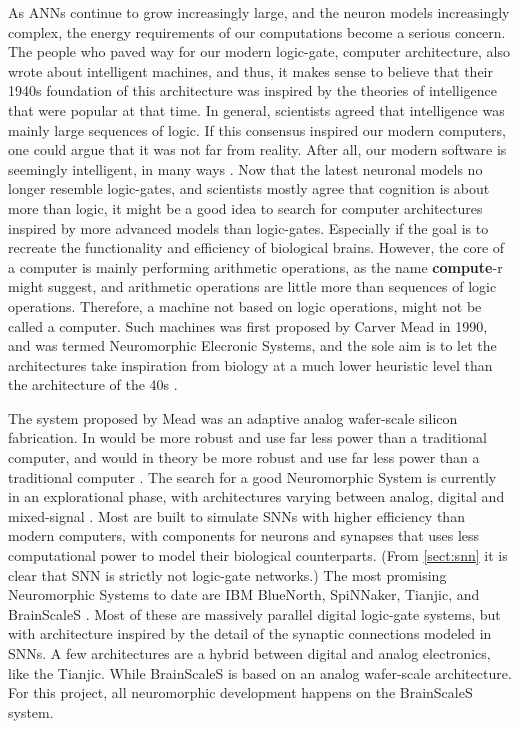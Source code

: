 As ANNs continue to grow increasingly large, and the neuron models increasingly complex, the energy requirements of our computations become a serious concern.
The people who paved way for our modern logic-gate, computer architecture, also wrote about intelligent machines, and thus,
it makes sense to believe that their 1940s foundation of this architecture was inspired by the theories of intelligence that were popular at that time.
In general, scientists agreed that intelligence was mainly large sequences of logic. If this consensus inspired our modern computers,
one could argue that it was not far from reality. After all, our modern software is seemingly intelligent, in many ways \cite{haenlein_brief_2019}.
Now that the latest neuronal models no longer resemble logic-gates, and scientists mostly agree that cognition is about more than logic,
it might be a good idea to search for computer architectures inspired by more advanced models than logic-gates.
Especially if the goal is to recreate the functionality and efficiency of biological brains.
However, the core of a computer is mainly performing arithmetic operations, as the name \textbf{compute}-r might suggest,
and arithmetic operations are little more than sequences of logic operations. Therefore, a machine not based on logic operations,
might not be called a computer.
Such machines was first proposed by Carver Mead in 1990, and was termed Neuromorphic Elecronic Systems, and the sole aim is to let the architectures take inspiration from biology at a much lower heuristic level than the architecture of the 40s \cite{mead_neuromorphic_1990}.

The system proposed by Mead was an adaptive analog wafer-scale silicon fabrication.
In would be more robust and use far less power than a traditional computer,
and would in theory be more robust and use far less power than a traditional computer \cite{mead_neuromorphic_1990}.
The search for a good Neuromorphic System is currently in an explorational phase, with architectures varying between analog, digital and mixed-signal \cite{schuman_survey_2017}.
Most are built to simulate SNNs with higher efficiency than modern computers, with components for neurons and synapses that uses less computational power to model their biological counterparts.
(From \vref{sect:snn} it is clear that SNN is strictly not logic-gate networks.)
The most promising Neuromorphic Systems to date are IBM BlueNorth, SpiNNaker, Tianjic, and BrainScaleS \cite{furber_large-scale_2016} \cite{schuman_survey_2017} \cite{pei_towards_2019}.
Most of these are massively parallel digital logic-gate systems, but with architecture inspired by the detail of the synaptic connections modeled in SNNs.\cite{aamir_accelerated_2018}
A few architectures are a hybrid between digital and analog electronics, like the Tianjic. While BrainScaleS is based on an analog wafer-scale architecture.
For this project, all neuromorphic development happens on the BrainScaleS system.

